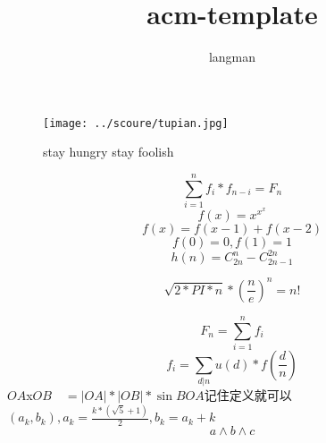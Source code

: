 \documentclass[a4paper,11pt]{article}
\author{langman}
\title{acm-template}
\begin{document}
\maketitle
\begin{CJK}{UTF8}{gbsn}
  \begin{figure}[!htb]
    \begin{center}
      \texttt{[image: ../scoure/tupian.jpg]}
      \caption{stay hungry stay foolish}
    \end{center}
  \end{figure}
$$\sum_{i=1}^n f_i*f_{n-i}=F_n$$
$$f(x)=x^{x^x}$$
$$f(x) = f(x-1)+f(x-2)$$
$$f(0) = 0,f(1) = 1$$
$$h(n) = C_{2n}^n - C_{2n-1}^{2n}$$

$$ \sqrt{2*PI*n} * (\frac{n}{e})^n = n!$$

$$ F_n = \sum_{i=1}^n f_i $$
$$ f_i = \sum_{d|n} u(d)*f(\frac{d}{n}) $$
$OA$x$OB\quad = |OA|*|OB|*\sin{BOA}$记住定义就可以
$( a_k,b_k),a_k=\frac{k*(\sqrt{5}+1)}{2} , b_k=a_k+k$
$$ a \land{b \land c} $$
\end{CJK}
\end{document}
